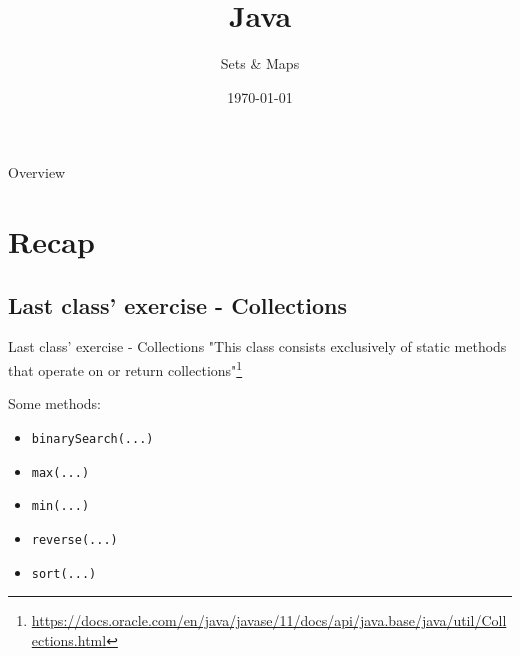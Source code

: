 


\title{Java}
\subtitle{Sets \& Maps}
\date{\today}


	
	\begin{frame}
		\titlepage
	\end{frame}
	
	\begin{frame}{Overview}
		\tableofcontents
	\end{frame}
	
	\section{Recap}
	\subsection{Last class' exercise - Collections}
	\begin{frame}{Last class' exercise - Collections}
		"This class consists exclusively of static methods that operate on or return collections"\footnote{\url{https://docs.oracle.com/en/java/javase/11/docs/api/java.base/java/util/Collections.html}}
		
		Some methods:
		\begin{itemize}
			\item \texttt{binarySearch(...)}
			\item \texttt{max(...)}
			\item \texttt{min(...)}
			\item \texttt{reverse(...)}
			\item \texttt{sort(...)}
		\end{itemize}
	\end{frame}
